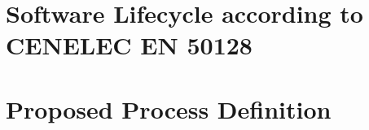 \documentclass{template/openetcs_article}
\begin{document}
\section{Software Lifecycle according to CENELEC EN 50128}
\label{sec:sofware-lifecycle}


\section{Proposed  Process Definition}
\label{sec:open-proc-defin}





%

\end{document}
